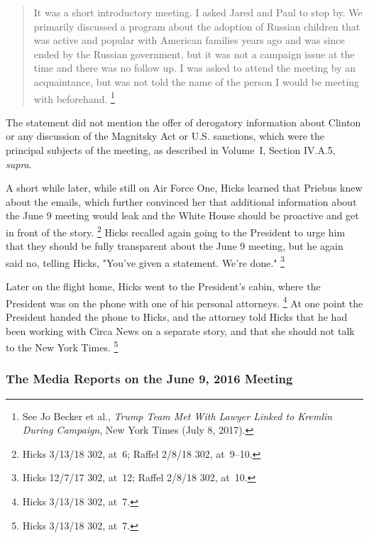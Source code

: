 {\begin{quote}
It was a short introductory meeting.
I asked Jared and Paul to stop by.
We primarily discussed a program about the adoption of Russian children that was active and popular with American families years ago and was since ended by the Russian government, but it was not a campaign issue at the time and there was no follow up.
I was asked to attend the meeting by an acquaintance, but was not told the name of the person I would be meeting with beforehand.%
\footnote{See Jo Becker et al., \textit{Trump Team Met With Lawyer Linked to Kremlin During Campaign}, New York Times (July 8, 2017).}
\end{quote}

The statement did not mention the offer of derogatory information about Clinton or any discussion of the Magnitsky Act or U.S. sanctions, which were the principal subjects of the meeting, as described in Volume~I, Section IV.A.5, \textit{supra}.

A short while later, while still on Air Force One, Hicks learned that Priebus knew about the emails, which further convinced her that additional information about the June 9 meeting would leak and the White House should be proactive and get in front of the story.%
\footnote{Hicks 3/13/18 302, at~6;
Raffel 2/8/18 302, at~9--10.}
Hicks recalled again going to the President to urge him that they should be fully transparent about the June 9 meeting, but he again said no, telling Hicks, "You've given a statement.
We're done."%
\footnote{Hicks 12/7/17 302, at~12;
Raffel 2/8/18 302, at~10.}

Later on the flight home, Hicks went to the President's cabin, where the President was on the phone with one of his personal attorneys.%
\footnote{Hicks 3/13/18 302, at~7.}
At one point the President handed the phone to Hicks, and the attorney told Hicks that he had been working with Circa News on a separate story, and that she should not talk to the New York Times.%
\footnote{Hicks 3/13/18 302, at~7.}

\subsubsection{The Media Reports on the June 9, 2016 Meeting}

}
